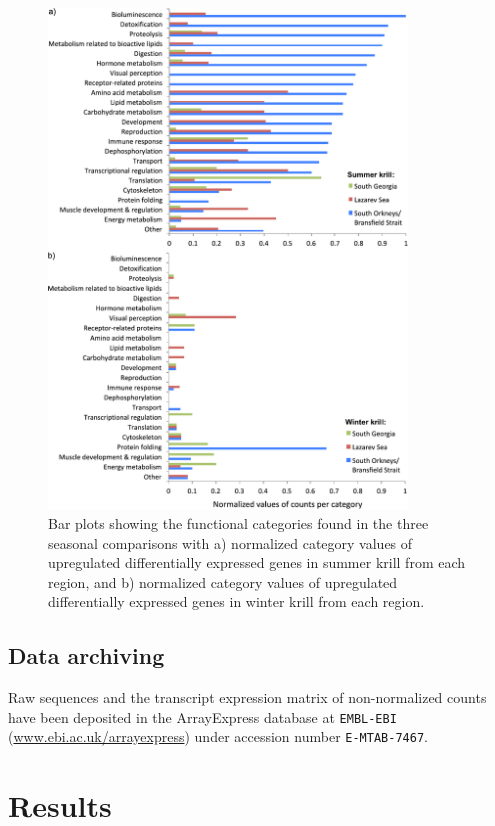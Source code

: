 

\begin{figure} 
        \centering
        \includegraphics[width=0.85\textwidth]{../Figures/Pub1_3.pdf}
        \caption{Bar plots showing the functional categories found in the three
        seasonal comparisons with a) normalized category values of upregulated
        differentially expressed genes in summer krill from each region, and b)
        normalized category values of upregulated differentially expressed
        genes in winter krill from each region.}
        \label{Pub1_3}
\end{figure}
\subsection{Data archiving}

Raw sequences and the transcript expression matrix of non-normalized counts
have been deposited in the ArrayExpress database at \texttt{EMBL-EBI}
(\url{www.ebi.ac.uk/arrayexpress}) under accession number \texttt{E-MTAB-7467}.

\section{Results}

